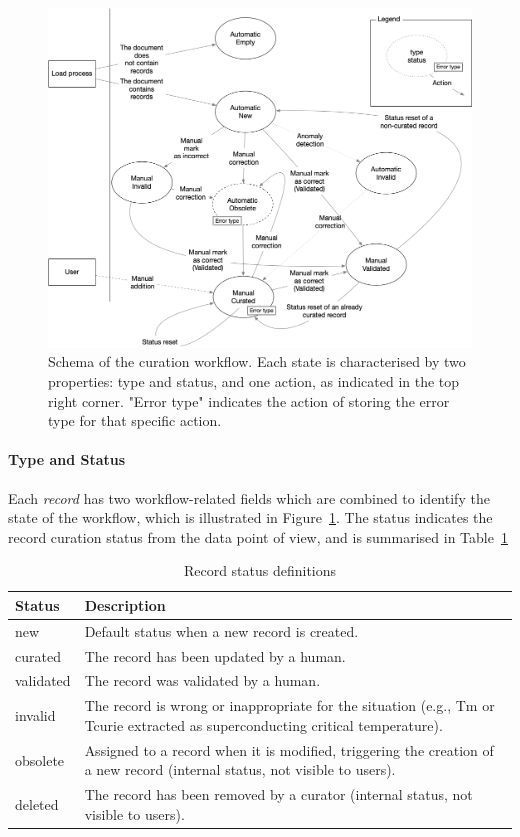 \documentclass[a4paper]{article}
\begin{document}
\begin{figure}[ht]
  \centering
  \includegraphics[width=1\textwidth]{images/record-correction} 
  \caption{Schema of the curation workflow. Each state is characterised by two properties: type and status, and one action, as indicated in the top right corner. "Error type" indicates the action of storing the error type for that specific action.}
  \label{fig:curation-workflow}
\end{figure}

\paragraph{Type and Status} Each \textit{record} has two workflow-related fields which are combined to identify the state of the workflow, which is illustrated in Figure~\ref{fig:curation-workflow}. 
The status indicates the record curation status from the data point of view, and is summarised in Table~\ref{tab:record-status}

\begin{table}[htbp]
\centering
\begin{tabular}{|p{2cm}|p{10cm}|}
\hline
\textbf{Status} & \textbf{Description} \\
\hline
new & Default status when a new record is created. \\
\hline
curated & The record has been updated by a human. \\
\hline
validated & The record was validated by a human. \\
\hline
invalid & The record is wrong or inappropriate for the situation (e.g., Tm or Tcurie extracted as superconducting critical temperature). \\
\hline
obsolete & Assigned to a record when it is modified, triggering the creation of a new record (internal status, not visible to users).\\
\hline
deleted & The record has been removed by a curator (internal status, not visible to users). \\
\hline
\end{tabular}
\caption{Record status definitions}
\label{tab:record-status}
\end{table}
    
\end{document}
